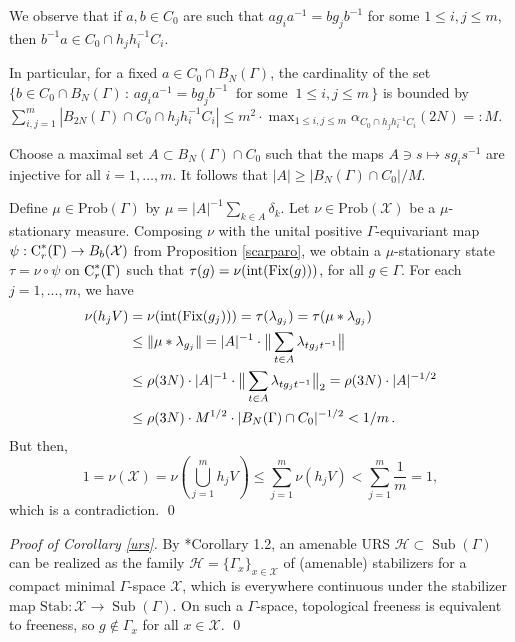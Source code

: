 \documentclass[12pt]{amsart}
\theoremstyle{definition}
\theoremstyle{remark}
\newcommand{\Sub}{\operatorname{Sub}}
\newcommand{\G}{\Gamma}
\begin{document}
We observe that if $a,b\in C_0$ are such that $ag_ia^{-1}=bg_jb^{-1}$ for some $1\le i, j\le m$, then $b^{-1}a\in C_0\cap h_jh_i^{-1}C_i$.

In particular, for a fixed $a\in C_0\cap B_N(\G)$, the cardinality of the set $\{b\in C_0 \cap B_N(\G) \,:\, ag_ia^{-1}=bg_jb^{-1} ~\text{ for some }~ 1\le i, j\le m\,\}$ is bounded by $\sum_{i,j=1}^m |B_{2N}(\G)\cap C_0\cap h_jh_i^{-1}C_i|\le m^2\cdot  \max_{1\le i,j\le m} \alpha_{\scriptscriptstyle C_0\cap h_jh_i^{-1}C_i}(2N)=:M$. 

Choose a maximal set $A\subset B_N(\G)\cap C_0$ such that the maps $A\ni s\mapsto sg_is^{-1}$ are injective for all $i=1, \dots, m$. It follows that $|A|\ge |B_{N}(\G)\cap C_0|/M$.


Define $\mu\in\text{Prob}(\Gamma)$ by $\mu = |A|^{-1}\sum_{k\in A}\delta_k$. Let $\nu\in \text{Prob}(\mathcal{X})$ be a $\mu$-stationary measure. Composing $\nu$ with the unital positive $\Gamma$-equivariant map $\psi: \textup{C}^*_r(\Gamma)\to B_b(\mathcal{X})$ from Proposition \ref{scarparo}, we obtain a $\mu$-stationary state $\tau = \nu\circ\psi$ on $\textup{C}^*_r(\Gamma)$ such that $\tau(g) = \nu({{\rm int}(\textup{Fix}(g))})$, for all $g\in\Gamma$. For each $j = 1, ..., m$, we have
\begin{align*}
\nu(h_jV) &= \nu({{\rm int}(\textup{Fix}(g_j))}) = \tau(\lambda_{g_j}) = \tau(\mu * \lambda_{g_j}) \\&\leq \|\mu * \lambda_{g_j}\|= |A|^{-1}\cdot \big\|\sum_{t\in A}\lambda_{tg_jt^{-1}}\big\|
\\&\leq 
\rho(3N)\cdot |A|^{-1}\cdot \big\|\sum_{t\in A}\lambda_{tg_jt^{-1}}\big\|_2 = \rho(3N)\cdot  |A|^{-1/2} 
\\&\le \rho(3N)\cdot M^{1/2} \cdot |B_{N}(\G)\cap C_0|^{-1/2}
< 1/m\,.
\end{align*}
But then,
\[
1 = \nu(\mathcal{X}) = \nu\left(\bigcup_{j=1}^mh_jV\right) \leq \sum_{j=1}^m \nu(h_jV) < \sum_{j=1}^m \frac{1}{m} = 1,
\]
which is a contradiction.
\qed


\medskip


\textit{Proof of Corollary \ref{urs}.} By  \cite{urs}*{Corollary 1.2}, an amenable URS $\mathcal{H}\subset \Sub(\Gamma)$ can be realized as the family $\mathcal{H} = \{\Gamma_x\}_{x\in\mathcal{X}}$ of (amenable) stabilizers for a compact minimal $\Gamma$-space $\mathcal{X}$, which is everywhere continuous under the stabilizer map $\text{Stab}: \mathcal{X}\to \Sub(\Gamma)$. On such a $\Gamma$-space, topological freeness is equivalent to freeness, so $g\not\in \Gamma_x$ for all $x\in\mathcal{X}$.
\qed
\end{document}
